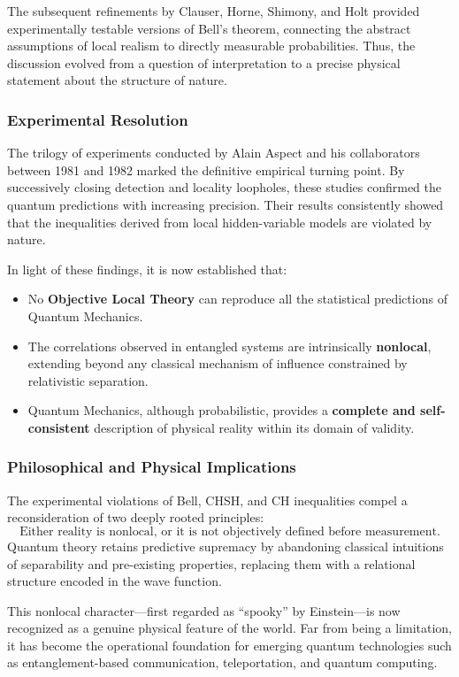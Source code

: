 The subsequent refinements by Clauser, Horne, Shimony, and Holt provided experimentally testable versions of Bell’s theorem, connecting the abstract assumptions of local realism to directly measurable probabilities.  
Thus, the discussion evolved from a question of interpretation to a precise physical statement about the structure of nature.

\subsubsection{Experimental Resolution}

The trilogy of experiments conducted by Alain Aspect and his collaborators between 1981 and 1982 marked the definitive empirical turning point.  
By successively closing detection and locality loopholes, these studies confirmed the quantum predictions with increasing precision.  
Their results consistently showed that the inequalities derived from local hidden-variable models are violated by nature.

In light of these findings, it is now established that:
\begin{itemize}
    \item No \textbf{Objective Local Theory} can reproduce all the statistical predictions of Quantum Mechanics.
    \item The correlations observed in entangled systems are intrinsically \textbf{nonlocal}, extending beyond any classical mechanism of influence constrained by relativistic separation.
    \item Quantum Mechanics, although probabilistic, provides a \textbf{complete and self-consistent} description of physical reality within its domain of validity.
\end{itemize}

\subsubsection{Philosophical and Physical Implications}

The experimental violations of Bell, CHSH, and CH inequalities compel a reconsideration of two deeply rooted principles:
\[
\text{Either reality is nonlocal, or it is not objectively defined before measurement.}
\]
Quantum theory retains predictive supremacy by abandoning classical intuitions of separability and pre-existing properties, replacing them with a relational structure encoded in the wave function.

This nonlocal character—first regarded as “spooky” by Einstein—is now recognized as a genuine physical feature of the world.  
Far from being a limitation, it has become the operational foundation for emerging quantum technologies such as entanglement-based communication, teleportation, and quantum computing.

